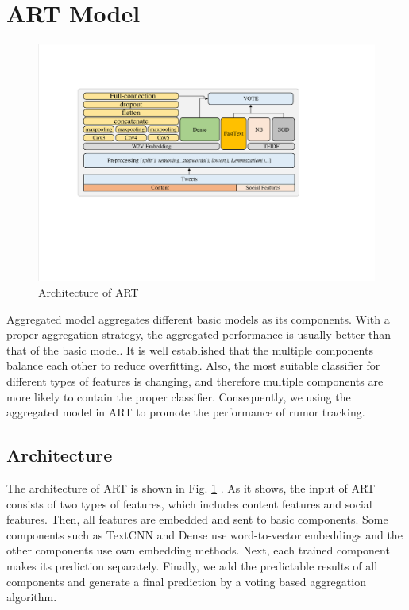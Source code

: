 \section{ART Model}
\label{sec:model}

\begin{figure}[htbp]
	\hspace{0ex}
	\vspace{0ex}
	\centering
	\includegraphics[width = \textwidth]{fig/structure}
	\caption{Architecture of ART}
	\label{fig:architecture}
\end{figure}

Aggregated model \cite{DBLP:conf/iccl2/Soto-FerrariCEH19, DBLP:conf/icccsec/WenYTWZSTYW18, DBLP:conf/wsc/LaippleMSWF18} aggregates different basic models as its components. With a proper aggregation strategy, the aggregated performance is usually better than that of the basic model. It is well established that the multiple components balance each other to reduce overfitting. Also, the most suitable classifier for different types of features is changing, and therefore multiple components are more likely to contain the proper classifier. Consequently, we using the aggregated model in ART to promote the performance of rumor tracking. 

\subsection{Architecture}
\label{sec:architecture}
The architecture of ART is shown in Fig. \ref{fig:architecture} . As it shows, the input of  ART consists of two types of features, which includes content features and social features. Then, all features are embedded and sent to basic components.  Some components such as TextCNN and Dense use word-to-vector embeddings and the other components use own embedding methods. Next, each trained component makes its prediction separately. Finally, we add the predictable results of all components and generate a final prediction by a voting based aggregation algorithm.

